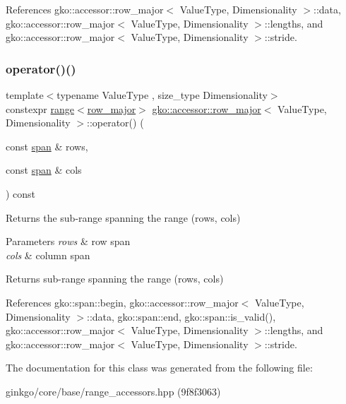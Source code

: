 References gko\+::accessor\+::row\+\_\+major$<$ Value\+Type, Dimensionality $>$\+::data, gko\+::accessor\+::row\+\_\+major$<$ Value\+Type, Dimensionality $>$\+::lengths, and gko\+::accessor\+::row\+\_\+major$<$ Value\+Type, Dimensionality $>$\+::stride.

\mbox{\label{classgko_1_1accessor_1_1row__major_ad1a38f9d96e849ae10de733809a3494d}} 
\subsubsection{\texorpdfstring{operator()()}{operator()()}\hspace{0.1cm}{\footnotesize\ttfamily [2/2]}}
{\footnotesize\ttfamily template$<$typename Value\+Type , size\+\_\+type Dimensionality$>$ \\
constexpr \hyperlink{classgko_1_1range}{range}$<$\hyperlink{classgko_1_1accessor_1_1row__major}{row\+\_\+major}$>$ \hyperlink{classgko_1_1accessor_1_1row__major}{gko\+::accessor\+::row\+\_\+major}$<$ Value\+Type, Dimensionality $>$\+::operator() (\begin{DoxyParamCaption}\item[{const \hyperlink{structgko_1_1span}{span} \&}]{rows,  }\item[{const \hyperlink{structgko_1_1span}{span} \&}]{cols }\end{DoxyParamCaption}) const}



Returns the sub-\/range spanning the range (rows, cols) 


\begin{DoxyParams}{Parameters}
{\em rows} & row span \\
\hline
{\em cols} & column span\\
\hline
\end{DoxyParams}
\begin{DoxyReturn}{Returns}
sub-\/range spanning the range (rows, cols) 
\end{DoxyReturn}


References gko\+::span\+::begin, gko\+::accessor\+::row\+\_\+major$<$ Value\+Type, Dimensionality $>$\+::data, gko\+::span\+::end, gko\+::span\+::is\+\_\+valid(), gko\+::accessor\+::row\+\_\+major$<$ Value\+Type, Dimensionality $>$\+::lengths, and gko\+::accessor\+::row\+\_\+major$<$ Value\+Type, Dimensionality $>$\+::stride.



The documentation for this class was generated from the following file\+:\begin{DoxyCompactItemize}
\item 
ginkgo/core/base/range\+\_\+accessors.\+hpp (9f8f3063)\end{DoxyCompactItemize}
